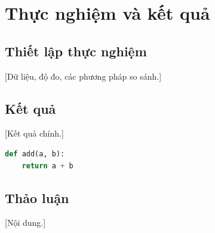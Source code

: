 \chapter{Thực nghiệm và kết quả}\label{chapter:experiment}
\pagestyle{fancy}

\section{Thiết lập thực nghiệm}
[Dữ liệu, độ đo, các phương pháp so sánh.]

\section{Kết quả}
[Kết quả chính.]

\begin{lstlisting}[language=Python, caption={Mẫu mã nguồn.}]
def add(a, b):
    return a + b
\end{lstlisting}

\section{Thảo luận}
[Nội dung.]
